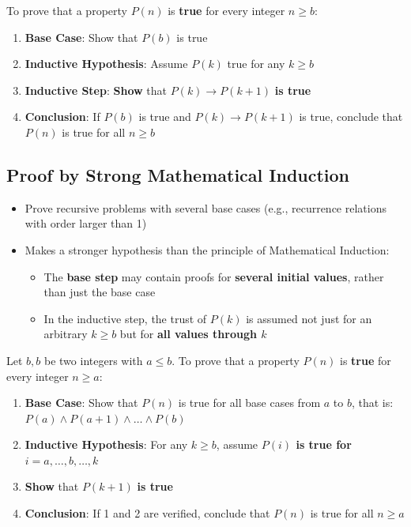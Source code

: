 To prove that a property $P(n)$ is \textbf{true} for every integer $n \geq b$:
\begin{enumerate}
  \item \textbf{Base Case}: Show that $P(b)$ is true
  \item \textbf{Inductive Hypothesis}: Assume $P(k)$ true for any $k \geq b$
  \item \textbf{Inductive Step}: \textbf{Show} that $P(k) \to P(k+1)$ \textbf{is true}
  \item \textbf{Conclusion}: If $P(b)$ is true and $P(k) \to P(k+1)$ is true, conclude that $P(n)$ is true for all $n \geq b$
\end{enumerate}

\subsection{Proof by Strong Mathematical Induction}
\begin{itemize}
  \item Prove recursive problems with several base cases (e.g., recurrence relations with order larger than 1)
  \item Makes a stronger hypothesis than the principle of Mathematical Induction:
  \begin{itemize}
    \item The \textbf{base step} may contain proofs for \textbf{several initial values}, rather than just the base case
    \item In the inductive step, the trust of $P(k)$ is assumed not just for an arbitrary $k \geq b$ but for \textbf{all values through $k$}
  \end{itemize}
\end{itemize}

Let $b, b$ be two integers with $a \leq b$. To prove that a property $P(n)$ is \textbf{true} for every integer $n \geq a$:
\begin{enumerate}
  \item \textbf{Base Case}: Show that $P(n)$ is true for all base cases from $a$ to $b$, that is: $P(a) \wedge P(a+1) \wedge \dots \wedge P(b)$
  \item \textbf{Inductive Hypothesis}: For any $k \geq b$, assume \textbf{$P(i)$ is true for} $i = a, \dots, b, \dots, k$
  \item \textbf{Show} that $P(k+1)$ \textbf{is true}
  \item \textbf{Conclusion}: If 1 and 2 are verified, conclude that $P(n)$ is true for all $n \geq a$
\end{enumerate}

